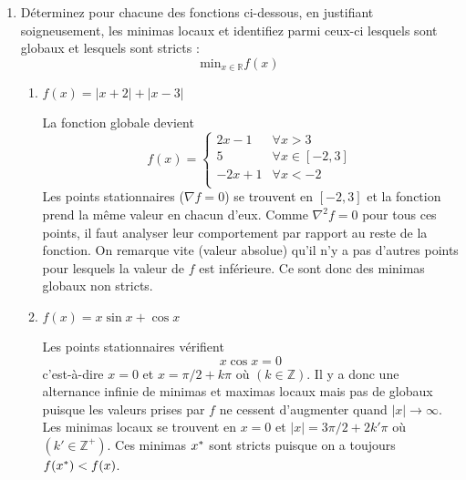 \begin{enumerate}
  \item Déterminez pour chacune des fonctions ci-dessous,
  en justifiant soigneusement, les minimas locaux
  et identifiez parmi ceux-ci lesquels sont globaux 
  et lesquels sont stricts :
  \[ \text{min}_{x \in \mathbb{R}} f(x) \]
  
  \begin{enumerate}
    \item $f(x) = |x+2| + |x-3|$
      \begin{solution}
        La fonction globale devient
        \[
          f(x) = \left\{ \begin{array}{rl}
            2x-1 & \forall x > 3 \\
            5 & \forall x \in [-2,3] \\
            -2x+1 & \forall x < -2 \\
            \end{array}\right.
        \]
        Les points stationnaires ($\nabla f = 0$) se trouvent en $[-2,3]$
        et la fonction prend la même valeur en chacun d'eux.
        Comme $\nabla^2 f=0$ pour tous ces points,
        il faut analyser leur comportement par rapport au reste de la fonction.
        On remarque vite (valeur absolue) 
        qu'il n'y a pas d'autres points pour lesquels
        la valeur de $f$ est inférieure.
        Ce sont donc des minimas globaux non stricts.
      \end{solution}
      
    \item $f(x) = x\sin{x} + \cos{x}$
      \begin{solution}
        Les points stationnaires vérifient
        \[x\cos{x} = 0\]
        c'est-à-dire $x=0$
        et $x= \pi/2 + k\pi$ où $(k\in\mathbb{Z})$.
        Il y a donc une alternance infinie de minimas et maximas locaux
        mais pas de globaux puisque les valeurs prises par $f$ ne cessent
        d'augmenter quand $|x| \rightarrow \infty$.
        Les minimas locaux se trouvent en $x=0$ 
        et $|x|= 3\pi/2 + 2k'\pi$ où $(k'\in\mathbb{Z}^+)$.
        Ces minimas $x^*$ sont stricts 
        puisque on a toujours $f(x^*) < f(x)$.
      \end{solution}
      

\end{enumerate}
\end{enumerate}
